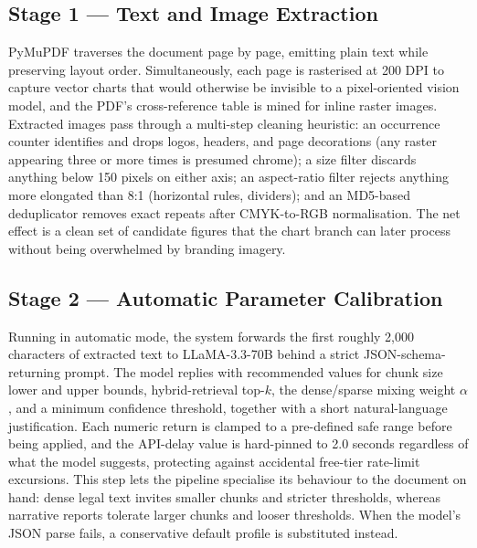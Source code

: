 \documentclass[conference]{IEEEtran}
\begin{document}
\subsection{Stage 1 --- Text and Image Extraction}
PyMuPDF traverses the document page by page, emitting plain text while preserving layout order. Simultaneously, each page is rasterised at 200 DPI to capture vector charts that would otherwise be invisible to a pixel-oriented vision model, and the PDF's cross-reference table is mined for inline raster images. Extracted images pass through a multi-step cleaning heuristic: an occurrence counter identifies and drops logos, headers, and page decorations (any raster appearing three or more times is presumed chrome); a size filter discards anything below 150 pixels on either axis; an aspect-ratio filter rejects anything more elongated than 8:1 (horizontal rules, dividers); and an MD5-based deduplicator removes exact repeats after CMYK-to-RGB normalisation. The net effect is a clean set of candidate figures that the chart branch can later process without being overwhelmed by branding imagery.
\subsection{Stage 2 --- Automatic Parameter Calibration}
Running in automatic mode, the system forwards the first roughly 2,000 characters of extracted text to LLaMA-3.3-70B behind a strict JSON-schema-returning prompt. The model replies with recommended values for chunk size lower and upper bounds, hybrid-retrieval top-$k$, the dense/sparse mixing weight $\alpha$, and a minimum confidence threshold, together with a short natural-language justification. Each numeric return is clamped to a pre-defined safe range before being applied, and the API-delay value is hard-pinned to 2.0 seconds regardless of what the model suggests, protecting against accidental free-tier rate-limit excursions. This step lets the pipeline specialise its behaviour to the document on hand: dense legal text invites smaller chunks and stricter thresholds, whereas narrative reports tolerate larger chunks and looser thresholds. When the model's JSON parse fails, a conservative default profile is substituted instead.
\end{document}

